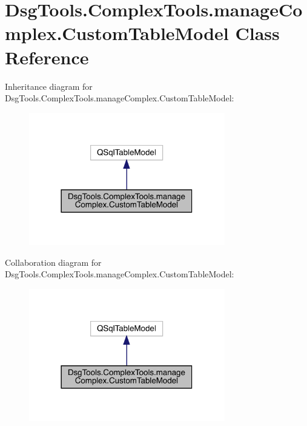 \hypertarget{class_dsg_tools_1_1_complex_tools_1_1manage_complex_1_1_custom_table_model}{}\section{Dsg\+Tools.\+Complex\+Tools.\+manage\+Complex.\+Custom\+Table\+Model Class Reference}
\label{class_dsg_tools_1_1_complex_tools_1_1manage_complex_1_1_custom_table_model}


Inheritance diagram for Dsg\+Tools.\+Complex\+Tools.\+manage\+Complex.\+Custom\+Table\+Model\+:
\nopagebreak
\begin{figure}[H]
\begin{center}
\leavevmode
\includegraphics[width=242pt]{class_dsg_tools_1_1_complex_tools_1_1manage_complex_1_1_custom_table_model__inherit__graph}
\end{center}
\end{figure}


Collaboration diagram for Dsg\+Tools.\+Complex\+Tools.\+manage\+Complex.\+Custom\+Table\+Model\+:
\nopagebreak
\begin{figure}[H]
\begin{center}
\leavevmode
\includegraphics[width=242pt]{class_dsg_tools_1_1_complex_tools_1_1manage_complex_1_1_custom_table_model__coll__graph}
\end{center}
\end{figure}
